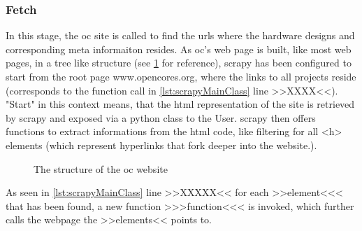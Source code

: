 \subsubsection{Fetch} 
In this stage, the \gls{oc} site is called to find the \glspl{url} where the hardware designs and corresponding meta informaiton resides. As \gls{oc}'s web page is built, like most web pages, in a tree like structure (see \cref{fig:opencoresStructure} for reference), \gls{scrapy} has been configured to start from the root page www.opencores.org, where the links to all projects reside (corresponds to the function call in \cref{lst:scrapyMainClass} line >>XXXX<<). "Start" in this context means, that the \Gls{html} representation of the site is retrieved by \gls{scrapy} and exposed via a \Gls{python} class to the User. \Gls{scrapy} then offers functions to extract informations from the \gls{html} code, like filtering for all <h> elements (which represent \glspl{hyperlink} that fork deeper into the website.).

\begin{figure}
 \caption{The structure of the \gls{oc} website}
 \label{fig:opencoresStructure}
\end{figure}


As seen in \cref{lst:scrapyMainClass} line >>XXXXX<< for each >>element<<< that has been found, a new function >>>function<<< is invoked, which further calls the webpage the >>elements<< points to. 

